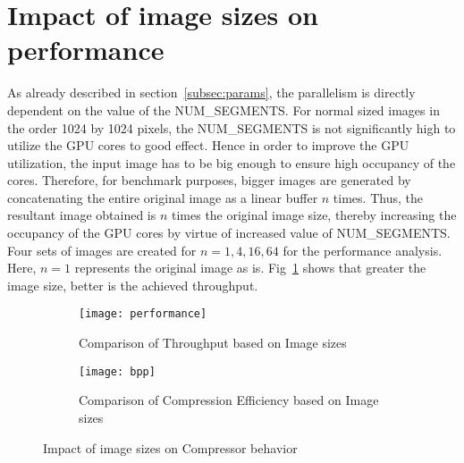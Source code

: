 \section{Impact of image sizes on performance}
As already described in section~\ref{subsec:params}, the parallelism is directly dependent on the value of the NUM\_SEGMENTS. For normal sized images in the order 1024 by 1024 pixels, the NUM\_SEGMENTS is not significantly high to utilize the \gls{GPU} cores to good effect. Hence in order to improve the \gls{GPU} utilization, the input image has to be big enough to ensure high occupancy of the cores. Therefore, for benchmark purposes, bigger images are generated by concatenating the entire original image as a linear buffer $n$ times. Thus, the resultant image obtained is $n$ times the original image size, thereby increasing the occupancy of the GPU cores by virtue of increased value of NUM\_SEGMENTS. Four sets of images are created for $n=1,4,16,64$ for the performance analysis. Here, $n=1$ represents the original image as is. Fig~\ref{fig:ana:compper} shows that greater the image size, better is the achieved throughput.
\begin{figure}[tb]
  \centering
  \begin{subfigure}[b]{0.88\textwidth}
    \texttt{[image: performance]}
    \caption{Comparison of Throughput based on Image sizes}
    \label{fig:ana:compper}
  \end{subfigure}
  \quad
  \begin{subfigure}[b]{0.88\textwidth}
    \texttt{[image: bpp]}
    \caption{Comparison of Compression Efficiency based on Image sizes}
    \label{fig:ana:compbpp}
  \end{subfigure}
  \caption{Impact of image sizes on Compressor behavior}
  \label{fig:ana:compbeh}
\end{figure}

